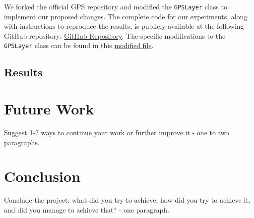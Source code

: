 \documentclass{acmart}
\begin{document}
We forked the official GPS repository and modified the \texttt{GPSLayer} class to implement our proposed changes. The complete code for our experiments, along with instructions to reproduce the results, is publicly available at the following GitHub repository: \href{https://github.com/omertalmi5/WeightedGraphGPS}{GitHub Repository}. The specific modifications to the \texttt{GPSLayer} class can be found in this \href{https://github.com/omertalmi5/WeightedGraphGPS/blob/main/graphgps/layer/gps_layer.py}{modified file}.

\subsection{Results}



\section{Future Work}
Suggest 1-2 ways to continue your work or further improve it - one to two paragraphs.

\section{Conclusion}
Conclude the project: what did you try to achieve, how did you try to achieve it, and did you manage to achieve that? - one paragraph.



\end{document}
